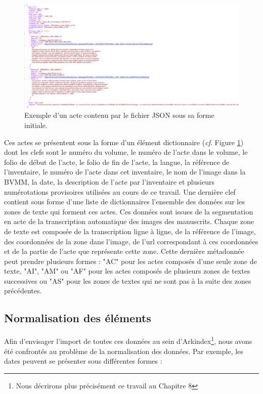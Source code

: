 \documentclass[a4paper,12pt,twoside]{book}
\begin{document}
	\begin{figure}
		\centering
		\includegraphics[width=\textwidth]{Images/json_zones_textes.png}
		\caption{Exemple d'un acte contenu par le fichier JSON sous sa forme initiale.}
		\label{json_initial}
	\end{figure}
	
	Ces actes se présentent sous la forme d'un élément dictionnaire (\textit{cf}. Figure \ref{json_initial}) dont les clefs sont le numéro du volume, le numéro de l'acte dans le volume, le folio de début de l'acte, le folio de fin de l'acte, la langue, la référence de l'inventaire, le numéro de l'acte dans cet inventaire, le nom de l'image dans la BVMM, la date, la description de l'acte par l'inventaire et plusieurs numérotations provisoires utilisées au cours de ce travail. Une dernière clef contient sous forme d'une liste de dictionnaires l'ensemble des données sur les zones de texte qui forment ces actes. Ces données sont issues de la segmentation en acte de la transcription automatique des images des manuscrits. Chaque zone de texte est composée de la transcription ligne à ligne, de la référence de l'image, des coordonnées de la zone dans l'image, de l'url correspondant à ces coordonnées et de la partie de l'acte que représente cette zone. Cette dernière métadonnée peut prendre plusieurs formes : "AC" pour les actes composés d'une seule zone de texte, "AI", "AM" ou "AF" pour les actes composés de plusieurs zones de textes successives ou "AS" pour les zones de textes qui ne sont pas à la suite des zones précédentes.
	
	\subsection{Normalisation des éléments}
	
	Afin d'envisager l'import de toutes ces données au sein d'Arkindex\footnote{Nous décrirons plus précisément ce travail au Chapitre 8}, nous avons été confrontés au problème de la normalisation des données. Par exemple, les dates peuvent se présenter sous différentes formes :
	
\end{document}
